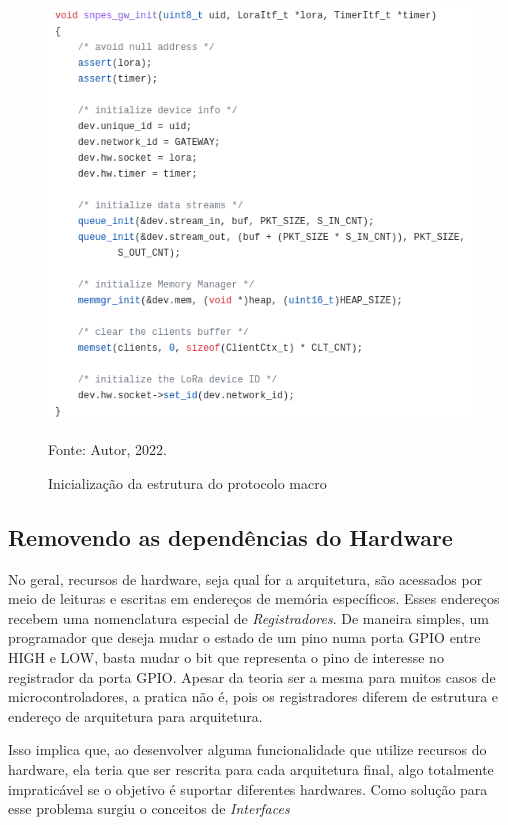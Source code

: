 \begin{figure}[H]
    \centering
	\caption{Inicialização da estrutura do protocolo macro}
    \includegraphics[height=0.4\textheight,keepaspectratio]{img/gw-init.png}
    \label{fig:gw-init}
    
    Fonte: Autor, 2022.
\end{figure}

\subsection{Removendo as dependências do Hardware}

No geral, recursos de hardware, seja qual for a arquitetura, são acessados
por meio de leituras e escritas em endereços de memória específicos. Esses
endereços recebem uma nomenclatura especial de \textit{Registradores}. De maneira
simples, um programador que deseja mudar o estado de um pino numa porta
GPIO entre HIGH e LOW, basta mudar o bit que representa o pino
de interesse no registrador da porta GPIO. Apesar da teoria ser a mesma
para muitos casos de microcontroladores, a pratica não é, pois os registradores
diferem de estrutura e endereço de arquitetura para arquitetura.

Isso implica que, ao desenvolver alguma funcionalidade que utilize recursos
do hardware, ela teria que ser rescrita para cada arquitetura final, algo
totalmente impraticável se o objetivo é suportar diferentes hardwares. Como
solução para esse problema surgiu o conceitos de \textit{Interfaces}

